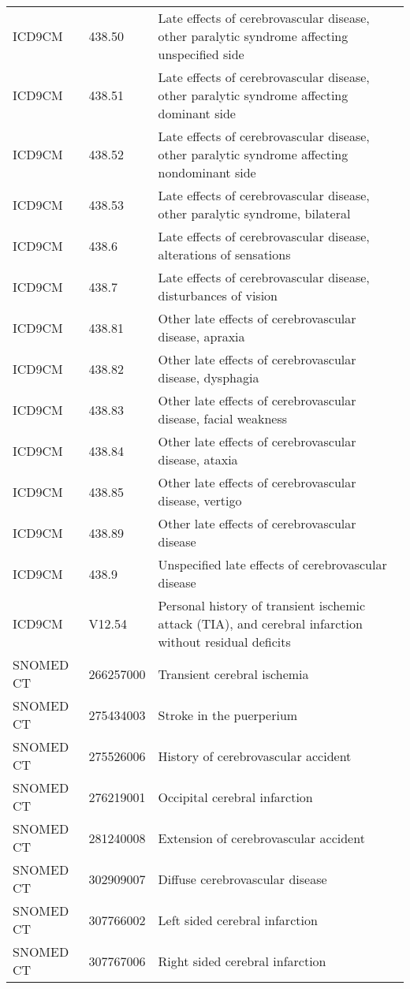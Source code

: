 \begin{longtable}{p{}p{}p{}}
  ICD9CM & 438.50 & Late effects of cerebrovascular disease, other paralytic syndrome affecting unspecified side \\ 
  ICD9CM & 438.51 & Late effects of cerebrovascular disease, other paralytic syndrome affecting dominant side \\ 
  ICD9CM & 438.52 & Late effects of cerebrovascular disease, other paralytic syndrome affecting nondominant side \\ 
  ICD9CM & 438.53 & Late effects of cerebrovascular disease, other paralytic syndrome, bilateral \\ 
  ICD9CM & 438.6 & Late effects of cerebrovascular disease, alterations of sensations \\ 
  ICD9CM & 438.7 & Late effects of cerebrovascular disease, disturbances of vision \\ 
  ICD9CM & 438.81 & Other late effects of cerebrovascular disease, apraxia \\ 
  ICD9CM & 438.82 & Other late effects of cerebrovascular disease, dysphagia \\ 
  ICD9CM & 438.83 & Other late effects of cerebrovascular disease, facial weakness \\ 
  ICD9CM & 438.84 & Other late effects of cerebrovascular disease, ataxia \\ 
  ICD9CM & 438.85 & Other late effects of cerebrovascular disease, vertigo \\ 
  ICD9CM & 438.89 & Other late effects of cerebrovascular disease \\ 
  ICD9CM & 438.9 & Unspecified late effects of cerebrovascular disease \\ 
  ICD9CM & V12.54 & Personal history of transient ischemic attack (TIA), and cerebral infarction without residual deficits \\ 
  SNOMED CT & 266257000 & Transient cerebral ischemia \\ 
  SNOMED CT & 275434003 & Stroke in the puerperium \\ 
  SNOMED CT & 275526006 & History of cerebrovascular accident \\ 
  SNOMED CT & 276219001 & Occipital cerebral infarction \\ 
  SNOMED CT & 281240008 & Extension of cerebrovascular accident \\ 
  SNOMED CT & 302909007 & Diffuse cerebrovascular disease \\ 
  SNOMED CT & 307766002 & Left sided cerebral infarction \\ 
  SNOMED CT & 307767006 & Right sided cerebral infarction \\ 

\end{longtable}
